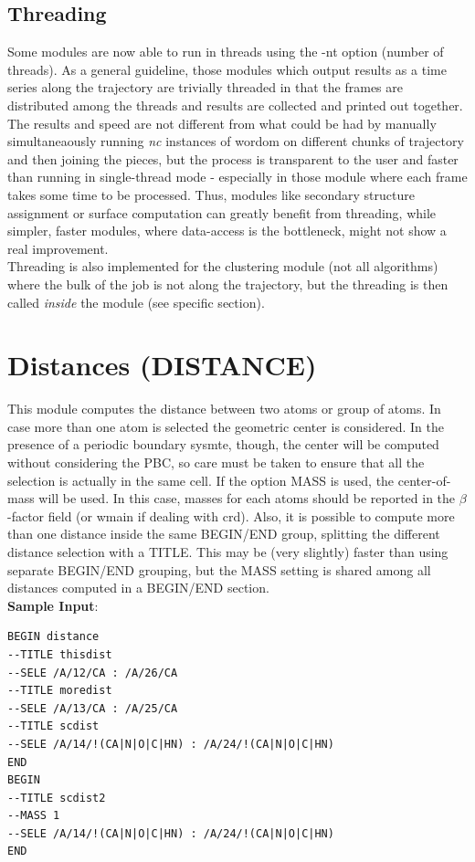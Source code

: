 \documentclass[11pt,twoside,onecolumn,a4paper,openright,notitlepage]{book}[2001/04/21]
\begin{document}
\subsection{Threading}
Some modules are now able to run in threads using the -nt option (number of threads). As a general guideline, those modules which output results as a time series along the trajectory are trivially threaded in that the frames are distributed among the threads and results are collected and printed out together. The results and speed are not different from what could be had by manually simultaneaously running \emph{nc} instances of wordom on different chunks of trajectory and then joining the pieces, but the process is transparent to the user and faster than running in single-thread mode - especially in those module where each frame takes some time to be processed. Thus, modules like secondary structure assignment or surface computation can greatly benefit from threading, while simpler, faster modules, where data-access is the bottleneck, might not show a real improvement.\\
Threading is also implemented for the clustering module (not all algorithms) where the bulk of the job is not along the trajectory, but the threading is then called \emph{inside} the module (see specific section).
\\
\clearpage{}

\section{Distances (DISTANCE)}
This module computes the distance between two atoms or group of atoms. In case more than one atom is selected the geometric center is considered. In the presence of a periodic boundary sysmte, though, the center will be computed without considering the PBC, so care must be taken to ensure that all the selection is actually in the same cell. If the option MASS is used, the center-of-mass will be used. In this case, masses for each atoms should be reported in the $\beta{}$-factor field (or wmain if dealing with crd). Also, it is possible to compute more than one distance inside the same BEGIN/END group, splitting the different distance selection with a TITLE. This may be (very slightly) faster than using separate BEGIN/END grouping, but the MASS setting is shared among all distances computed in a BEGIN/END section.\\

\textbf{\large Sample Input}:
\begin{verbatim}
BEGIN distance
--TITLE thisdist
--SELE /A/12/CA : /A/26/CA
--TITLE moredist
--SELE /A/13/CA : /A/25/CA
--TITLE scdist
--SELE /A/14/!(CA|N|O|C|HN) : /A/24/!(CA|N|O|C|HN)
END
BEGIN
--TITLE scdist2
--MASS 1
--SELE /A/14/!(CA|N|O|C|HN) : /A/24/!(CA|N|O|C|HN)
END
\end{verbatim}
\end{document}
